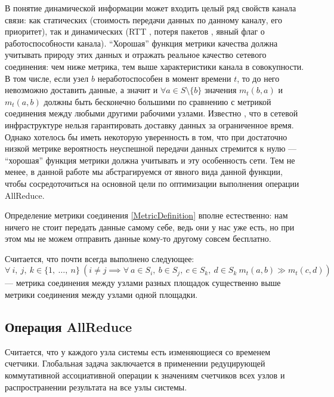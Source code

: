 \begin{remark}
\label{MetricPhysicalMeaning}
    В понятие динамической информации может входить целый ряд свойств канала связи: как статических (стоимость передачи данных по данному каналу, его приоритет), так и динамических (RTT \cite{definition:round-trip_delay_time}, потеря пакетов \cite{RFC1242}, явный флаг о работоспособности канала). \enquote{Хорошая} функция метрики качества должна учитывать природу этих данных и отражать реальное качество сетевого соединения: чем ниже метрика, тем выше характеристики канала в совокупности. В том числе, если узел $b$ неработоспособен в момент времени $t$, то до него невозможно доставить данные, а значит и $\forall a \in S \setminus \{ b \}$ значения $m_t(b, a)$ и $m_t(a, b)$ должны быть бесконечно большими по сравнению с метрикой соединения между любыми другими рабочими узлами. Известно \cite{networking:best-effort-service}, что в сетевой инфраструктуре нельзя гарантировать доставку данных за ограниченное время. Однако хотелось бы иметь некоторую уверенность в том, что при достаточно низкой метрике вероятность неуспешной передачи данных стремится к нулю --- \enquote{хорошая} функция метрики должна учитывать и эту особенность сети. Тем не менее, в данной работе мы абстрагируемся от явного вида данной функции, чтобы сосредоточиться на основной цели по оптимизации выполнения операции AllReduce.
\end{remark}

Определение метрики соединения \ref{MetricDefinition} вполне естественно: нам ничего не стоит передать данные самому себе, ведь они у нас уже есть, но при этом мы не можем отправить данные кому-то другому совсем бесплатно.

\begin{remark}
\label{MetricEmpiricalRule}
    Считается, что почти всегда выполнено следующее: 
    \[
        \forall\ i,\ j,\ k \in \{1,\ \ldots,\ n\}\ ( i \neq j \implies \forall\ a \in S_i,\ b \in S_j,\ c \in S_k,\ d \in S_k\ m_t(a, b) \gg m_t(c, d))
    \] --- метрика соединения между узлами разных площадок существенно выше метрики соединения между узлами одной площадки.
\end{remark}

\subsection{Операция AllReduce}

Считается, что у каждого узла системы есть изменяющиеся со временем счетчики. Глобальная задача заключается в применении редуцирующей коммутативной ассоциативной операции к значениям счетчиков всех узлов и распространении результата на все узлы системы.

